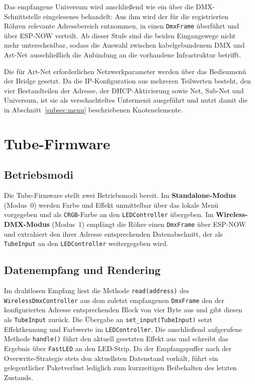 Das empfangene Universum wird anschließend wie ein über die
DMX-Schnittstelle eingelesenes behandelt: Aus ihm wird der für die
registrierten Röhren relevante Adressbereich entnommen, in einen
\texttt{DmxFrame} überführt und über ESP-NOW verteilt. Ab dieser Stufe
sind die beiden Eingangswege nicht mehr unterscheidbar, sodass die
Auswahl zwischen kabelgebundenem DMX und Art-Net ausschließlich die
Anbindung an die vorhandene Infrastruktur betrifft.

Die für Art-Net erforderlichen Netzwerkparameter werden über das
Bedienmenü der Bridge gesetzt. Da die IP-Konfiguration aus mehreren
Teilwerten besteht, den vier Bestandteilen der Adresse, der
DHCP-Aktivierung sowie Net, Sub-Net und Universum, ist sie als
verschachteltes Untermenü ausgeführt und nutzt damit die in
Abschnitt~\ref{subsec:menu} beschriebenen Knotenelemente.

\section{Tube-Firmware}
\label{sec:tube-firmware}

\subsection{Betriebsmodi}
\label{subsec:tube-modi}

Die Tube-Firmware stellt zwei Betriebsmodi bereit. Im
\textbf{Standalone-Modus} (Modus~0) werden Farbe und Effekt unmittelbar über
das lokale Menü vorgegeben und als \texttt{CRGB}-Farbe an den
\texttt{LEDController} übergeben. Im \textbf{Wireless-DMX-Modus}
(Modus~1) empfängt die Röhre einen \texttt{DmxFrame} über ESP-NOW und
extrahiert den ihrer Adresse entsprechenden Datenabschnitt, der als
\texttt{TubeInput} an den \texttt{LEDController} weitergegeben wird.

\subsection{Datenempfang und Rendering}
\label{subsec:tube-rendering}

Im drahtlosen Empfang liest die Methode \texttt{read(address)} des
\texttt{WirelessDmxController} aus dem zuletzt empfangenen
\texttt{DmxFrame} den der konfigurierten Adresse entsprechenden Block von
vier Byte aus und gibt diesen als \texttt{TubeInput} zurück. Die Übergabe
an \texttt{set\_input(TubeInput)} setzt Effektkennung und Farbwerte im
\texttt{LEDController}. Die anschließend aufgerufene Methode
\texttt{handle()} führt den aktuell gesetzten Effekt aus und schreibt das
Ergebnis über \texttt{FastLED} an den LED-Strip. Da der Empfangspuffer
nach der Overwrite-Strategie stets den aktuellsten Datenstand vorhält,
führt ein gelegentlicher Paketverlust lediglich zum kurzzeitigen
Beibehalten des letzten Zustands.

